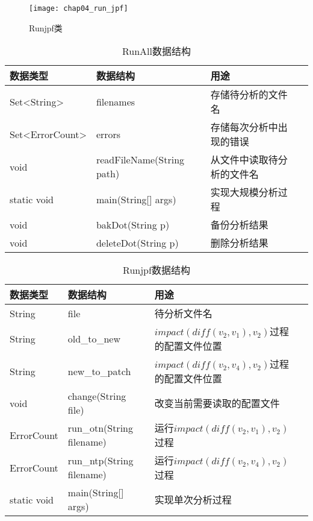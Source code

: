 \begin{figure}[H]
	\centering
	\texttt{[image: chap04\_run\_jpf]}
	\caption {Runjpf类}
	\label {class_run_jpf}	
\end{figure}

\begin{table}
	\caption{RunAll数据结构}
	\label{run_all_data}
	\centering
	\begin{tabular}{lllc}
		\toprule[1.5pt]
		{\heiti 数据类型} &{\heiti 数据结构} & {\heiti 用途} \\\midrule[1pt]
		Set<String> & filenames & 存储待分析的文件名 \\
		Set<ErrorCount> & errors & 存储每次分析中出现的错误 \\
		void & readFileName(String path) & 从文件中读取待分析的文件名\\
		static void & main(String[] args) & 实现大规模分析过程\\
		void & bakDot(String p) & 备份分析结果\\
		void & deleteDot(String p) & 删除分析结果\\
		\bottomrule[1.5pt]
	\end{tabular}
\end{table}

\begin{table}
	\caption{Runjpf数据结构}
	\label{run_jpf_data}
	\centering
	\begin{tabular}{lllc}
		\toprule[1.5pt]
		{\heiti 数据类型} &{\heiti 数据结构} & {\heiti 用途} \\\midrule[1pt]
		String & file & 待分析文件名\\
		String & old\_to\_new & $impact(diff(v_2,v_1),v_2)$过程的配置文件位置\\
		String & new\_to\_patch & $impact(diff(v_2,v_4),v_2)$过程的配置文件位置\\
		void & change(String file) & 改变当前需要读取的配置文件\\
		ErrorCount & run\_otn(String filename) & 运行$impact(diff(v_2,v_1),v_2)$过程 \\
		ErrorCount & run\_ntp(String filename) & 运行$impact(diff(v_2,v_4),v_2)$过程  \\
		static void & main(String[] args) & 实现单次分析过程\\
		\bottomrule[1.5pt]
	\end{tabular}
\end{table}


